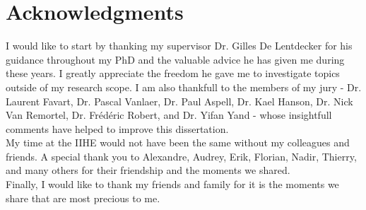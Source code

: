 \chapter*{Acknowledgments}

  I would like to start by thanking my supervisor Dr. Gilles De Lentdecker for his guidance throughout my PhD and the valuable advice he has given me during these years. I greatly appreciate the freedom he gave me to investigate topics outside of my research scope. I am also thankfull to the members of my jury - Dr. Laurent Favart, Dr. Pascal Vanlaer, Dr. Paul Aspell, Dr. Kael Hanson, Dr. Nick Van Remortel, Dr. Frédéric Robert, and Dr. Yifan Yand -  whose insightfull comments have helped to improve this dissertation. \\

  My time at the IIHE would not have been the same without my colleagues and friends. A special thank you to Alexandre, Audrey, Erik, Florian, Nadir, Thierry, and many others for their friendship and the moments we shared. \\

  Finally, I would like to thank my friends and family for it is the moments we share that are most precious to me.
